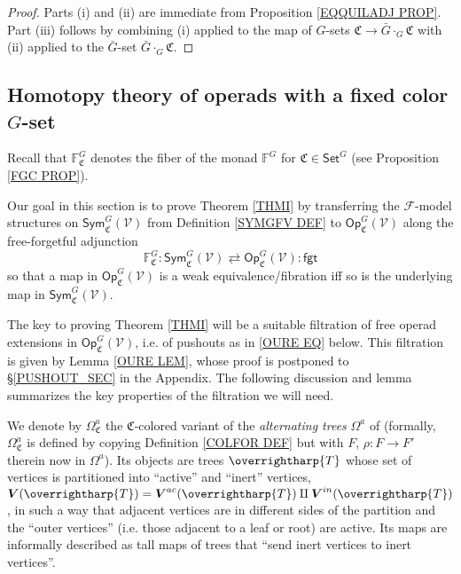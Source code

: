 \documentclass[a4paper,10pt
,draft
]{article}%
\numberwithin{equation}{section}
\numberwithin{figure}{section}
\theoremstyle{definition} %
\newcommand{\vect}[1]{\text{\overrightharp{\ensuremath{#1}}}}
\newcommand{\F}{\ensuremath{\mathcal F}}
\newcommand{\V}{\ensuremath{\mathcal V}}
\newcommand{\1}{\ensuremath{\mathbbm 1}}%
\begin{document}
\begin{proof}
	Parts (i) and (ii) are immediate from Proposition \ref{EQQUILADJ PROP}.
%	
	Part (iii) follows by combining (i) applied to 
	the map of $G$-sets $\mathfrak{C} \to \bar{G} \cdot_G \mathfrak{C}$
	with (ii) applied to the $\bar{G}$-set $\bar{G} \cdot_G \mathfrak{C}$.
\end{proof}




 
\subsection{Homotopy theory of operads with a fixed color $G$-set}
\label{OPC_MS_SEC}


Recall that $\mathbb{F}^G_{\mathfrak{C}}$
denotes the fiber of the monad $\mathbb{F}^G$
for $\mathfrak{C} \in \mathsf{Set}^G$
(see Proposition \ref{FGC PROP}).

Our goal in this section is to prove 
Theorem \ref{THMI} by transferring the $\F$-model structures on
$\mathsf{Sym}^G_{\mathfrak{C}}(\V)$
from Definition \ref{SYMGFV DEF}
to $\mathsf{Op}^G_{\mathfrak{C}}(\V)$
along the free-forgetful adjunction
\begin{equation}\label{OPAUTADJ EQ}
\mathbb{F}^G_{\mathfrak{C}} \colon
\mathsf{Sym}^G_{\mathfrak{C}}(\V)
\rightleftarrows
\mathsf{Op}^G_{\mathfrak{C}}(\V)
\colon \mathsf{fgt}
\end{equation}
so that a map in $\mathsf{Op}^G_{\mathfrak{C}}(\V)$
is a weak equivalence/fibration iff so is the underlying map in 
$\mathsf{Sym}^G_{\mathfrak{C}}(\V)$.
%


The key to proving Theorem \ref{THMI} will be a suitable filtration of free operad extensions in $\mathsf{Op}_{\mathfrak{C}}^G(\V)$,
i.e. of pushouts as in \eqref{OURE EQ} below.
This filtration is given by Lemma \ref{OURE LEM},
whose proof is postponed to \S \ref{PUSHOUT_SEC} in the Appendix.
The following discussion and lemma summarizes the key properties of the filtration we will need.

We denote by $\Omega^a_{\mathfrak{C}}$
the $\mathfrak{C}$-colored variant of the 
\emph{alternating trees} $\Omega^a$ of \cite[Def. 5.52]{BP_geo}
(formally, $\Omega^a_{\mathfrak{C}}$ is defined by copying
Definition \ref{COLFOR DEF} but with 
$F$, $\rho \colon F \to F'$ therein now in $\Omega^a$).
%
Its objects are trees $\vect{T}$ 
whose set of vertices is partitioned into ``active'' and ``inert'' vertices,
$\boldsymbol{V}(\vect T) = 
\boldsymbol{V}^{ac}(\vect T) \amalg \boldsymbol{V}^{in}(\vect T)$,
in such a way that adjacent vertices are in different sides of the partition and the ``outer vertices'' (i.e. those adjacent to a leaf or root) are active.
Its maps are informally described as tall maps of trees that 
``send inert vertices to inert vertices''.
\end{document}
